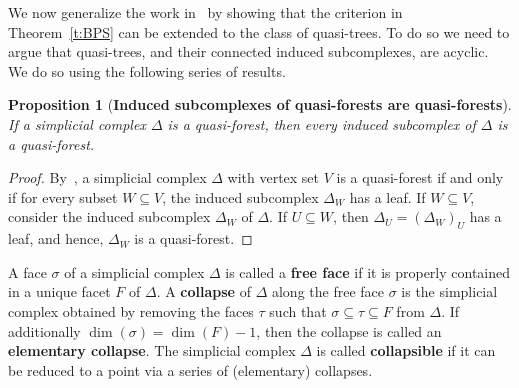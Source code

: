\documentclass[11pt]{article}
\newtheorem{prop}[theo]{Proposition}
\theoremstyle{definition}
\numberwithin{equation}{section}
\newcommand{\D}{\Delta}
\begin{document}
We now generalize the work in~\cite{F14} by showing that the criterion
in Theorem~\ref{t:BPS} can be extended to the class of quasi-trees. To do so
we need to argue that quasi-trees, and their connected induced
subcomplexes, are acyclic. We do so using the following series of
results.

\begin{prop}[{\bf Induced subcomplexes of  quasi-forests are quasi-forests}]\label{p:qtree-induced} If a simplicial complex  $\D$ is a 
quasi-forest, then every induced subcomplex of $\D$ is a quasi-forest.
\end{prop}

\begin{proof} By~\cite[Proposition 6]{FH},
a simplicial complex $\D$ with vertex set $V$ is a quasi-forest if
and only if for every subset $W \subseteq V$, the induced subcomplex
$\D_W$ has a leaf.  If $W \subseteq V$, consider the induced
subcomplex $\D_W$ of $\D$. If $U \subseteq W$, then $\D_U=(\D_W)_U$
has a leaf, and hence, $\D_W$ is a quasi-forest.
\end{proof}

A face $\sigma$ of a simplicial complex $\D$ is called a {\bf free
face} if it is properly contained in a unique facet $F$ of
$\D$. A {\bf collapse} of $\D$ along the free face $\sigma$ is the simplicial complex obtained by removing the faces $\tau$ such that $\sigma\subseteq \tau
\subseteq F$ from $\D$.  If additionally $\dim(\sigma)=\dim(F)-1$,
then the collapse is called an {\bf elementary collapse}. The
simplicial complex $\D$ is called {\bf collapsible} if it can be
reduced to a point via a series of \textup{(}elementary\textup{)} collapses.
\end{document}
